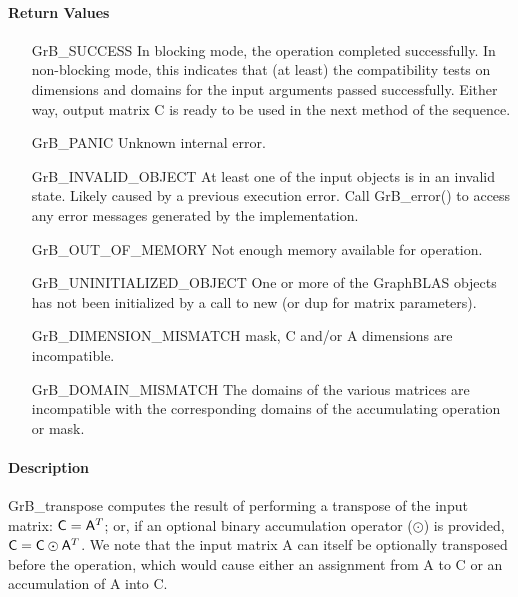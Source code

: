 \paragraph{Return Values}

\begin{itemize}[leftmargin=2.1in]
    \item[{\sf GrB\_SUCCESS}]         In blocking mode, the operation completed
	successfully. In non-blocking mode, this indicates that (at least) the compatibility 
    tests on dimensions and domains for the input arguments passed successfully. 
    Either way, output matrix {\sf C} is ready to be used in the next method of 
    the sequence.

    \item[{\sf GrB\_PANIC}]            Unknown internal error.
    
    \item[{\sf GrB\_INVALID\_OBJECT}] At least one of the input objects is
	    in an invalid state. Likely caused by a previous execution error.
    Call {\sf GrB\_error()} to access 
    any error messages generated by the implementation.

    \item[{\sf GrB\_OUT\_OF\_MEMORY}]  Not enough memory available for operation.
    
    \item[{\sf GrB\_UNINITIALIZED\_OBJECT}] One or more of the GraphBLAS objects 
    has not been initialized by a call to {\sf new} (or {\sf dup} for matrix
    parameters).
    
    \item[{\sf GrB\_DIMENSION\_MISMATCH}]  {\sf mask}, {\sf C} and/or {\sf A} dimensions are
    incompatible. 
    
    \item[{\sf GrB\_DOMAIN\_MISMATCH}]    The domains of the various matrices are
	incompatible with the corresponding domains of the accumulating operation or mask.
\end{itemize}

\paragraph{Description}

{\sf GrB\_transpose} computes the result of performing a transpose of the input matrix:
${\sf C} = {\sf A}^T$; or, if an optional binary accumulation 
operator ($\odot$) is provided, ${\sf C} = {\sf C} \odot {\sf A}^T$.  
We note that the input matrix {\sf A} can itself be optionally transposed before the operation,
which would cause either an assignment from {\sf A} to {\sf C} or an
accumulation of {\sf A} into {\sf C}.

